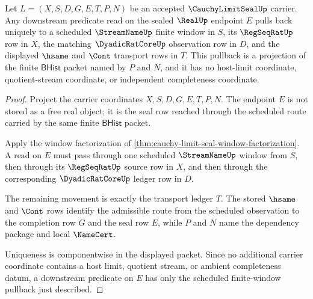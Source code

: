 \begin{theorem}
\label{thm:cauchy-limit-seal-scheduled-window-pullback}
Let $L=(X,S,D,G,E,T,P,N)$ be an accepted $\CauchyLimitSealUp$ carrier. Any downstream predicate read on the sealed $\RealUp$ endpoint $E$ pulls back uniquely to a scheduled $\StreamNameUp$ finite window in $S$, its $\RegSeqRatUp$ row in $X$, the matching $\DyadicRatCoreUp$ observation row in $D$, and the displayed $\hsame$ and $\Cont$ transport rows in $T$. This pullback is a projection of the finite $\mathsf{BHist}$ packet named by $P$ and $N$, and it has no host-limit coordinate, quotient-stream coordinate, or independent completeness coordinate.
\end{theorem}
\begin{proof}
Project the carrier coordinates $X,S,D,G,E,T,P,N$. The endpoint $E$ is not stored as a free real object; it is the seal row reached through the scheduled route carried by the same finite $\mathsf{BHist}$ packet.

Apply the window factorization of \autoref{thm:cauchy-limit-seal-window-factorization}. A read on $E$ must pass through one scheduled $\StreamNameUp$ window from $S$, then through its $\RegSeqRatUp$ source row in $X$, and then through the corresponding $\DyadicRatCoreUp$ ledger row in $D$.

The remaining movement is exactly the transport ledger $T$. The stored $\hsame$ and $\Cont$ rows identify the admissible route from the scheduled observation to the completion row $G$ and the seal row $E$, while $P$ and $N$ name the dependency package and local $\NameCert$.

Uniqueness is componentwise in the displayed packet. Since no additional carrier coordinate contains a host limit, quotient stream, or ambient completeness datum, a downstream predicate on $E$ has only the scheduled finite-window pullback just described.
\end{proof}

